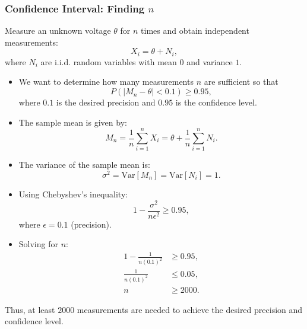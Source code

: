 \subsubsection{Confidence Interval: Finding $n$}
\begin{example}
    Measure an unknown voltage $\theta$ for $n$ times and obtain independent measurements:
    \[
    X_i = \theta + N_i,
    \]
    where $N_i$ are i.i.d. random variables with mean $0$ and variance $1$.

    \begin{itemize}
        \item We want to determine how many measurements $n$ are sufficient so that 
        \[
        P\left(|M_n - \theta| < 0.1\right) \geq 0.95,
        \]
        where $0.1$ is the desired precision and $0.95$ is the confidence level.
        
        \item The sample mean is given by:
        \[
        M_n = \frac{1}{n} \sum_{i=1}^n X_i = \theta + \frac{1}{n} \sum_{i=1}^n N_i.
        \]

        \item The variance of the sample mean is:
        \[
        \sigma^2 = \text{Var}[M_n] = \text{Var}[N_i] = 1.
        \]

        \item Using Chebyshev's inequality:
        \[
        1 - \frac{\sigma^2}{n\epsilon^2} \geq 0.95,
        \]
        where $\epsilon = 0.1$ (precision).

        \item Solving for $n$:
        \begin{align*}
        1 - \frac{1}{n(0.1)^2} &\geq 0.95, \\
        \frac{1}{n(0.1)^2} &\leq 0.05, \\
        n &\geq 2000.
        \end{align*}
    \end{itemize}

    Thus, at least $2000$ measurements are needed to achieve the desired precision and confidence level.
\end{example}

